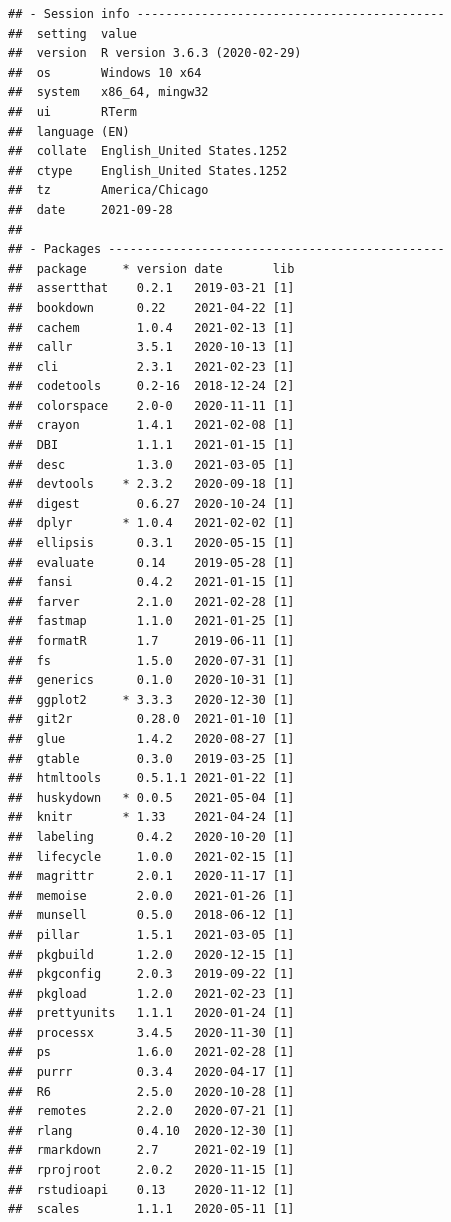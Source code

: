 \documentclass[print]{nuthesis}
\begin{document}
\begin{verbatim}
## - Session info -------------------------------------------
##  setting  value                       
##  version  R version 3.6.3 (2020-02-29)
##  os       Windows 10 x64              
##  system   x86_64, mingw32             
##  ui       RTerm                       
##  language (EN)                        
##  collate  English_United States.1252  
##  ctype    English_United States.1252  
##  tz       America/Chicago             
##  date     2021-09-28                  
## 
## - Packages -----------------------------------------------
##  package     * version date       lib
##  assertthat    0.2.1   2019-03-21 [1]
##  bookdown      0.22    2021-04-22 [1]
##  cachem        1.0.4   2021-02-13 [1]
##  callr         3.5.1   2020-10-13 [1]
##  cli           2.3.1   2021-02-23 [1]
##  codetools     0.2-16  2018-12-24 [2]
##  colorspace    2.0-0   2020-11-11 [1]
##  crayon        1.4.1   2021-02-08 [1]
##  DBI           1.1.1   2021-01-15 [1]
##  desc          1.3.0   2021-03-05 [1]
##  devtools    * 2.3.2   2020-09-18 [1]
##  digest        0.6.27  2020-10-24 [1]
##  dplyr       * 1.0.4   2021-02-02 [1]
##  ellipsis      0.3.1   2020-05-15 [1]
##  evaluate      0.14    2019-05-28 [1]
##  fansi         0.4.2   2021-01-15 [1]
##  farver        2.1.0   2021-02-28 [1]
##  fastmap       1.1.0   2021-01-25 [1]
##  formatR       1.7     2019-06-11 [1]
##  fs            1.5.0   2020-07-31 [1]
##  generics      0.1.0   2020-10-31 [1]
##  ggplot2     * 3.3.3   2020-12-30 [1]
##  git2r         0.28.0  2021-01-10 [1]
##  glue          1.4.2   2020-08-27 [1]
##  gtable        0.3.0   2019-03-25 [1]
##  htmltools     0.5.1.1 2021-01-22 [1]
##  huskydown   * 0.0.5   2021-05-04 [1]
##  knitr       * 1.33    2021-04-24 [1]
##  labeling      0.4.2   2020-10-20 [1]
##  lifecycle     1.0.0   2021-02-15 [1]
##  magrittr      2.0.1   2020-11-17 [1]
##  memoise       2.0.0   2021-01-26 [1]
##  munsell       0.5.0   2018-06-12 [1]
##  pillar        1.5.1   2021-03-05 [1]
##  pkgbuild      1.2.0   2020-12-15 [1]
##  pkgconfig     2.0.3   2019-09-22 [1]
##  pkgload       1.2.0   2021-02-23 [1]
##  prettyunits   1.1.1   2020-01-24 [1]
##  processx      3.4.5   2020-11-30 [1]
##  ps            1.6.0   2021-02-28 [1]
##  purrr         0.3.4   2020-04-17 [1]
##  R6            2.5.0   2020-10-28 [1]
##  remotes       2.2.0   2020-07-21 [1]
##  rlang         0.4.10  2020-12-30 [1]
##  rmarkdown     2.7     2021-02-19 [1]
##  rprojroot     2.0.2   2020-11-15 [1]
##  rstudioapi    0.13    2020-11-12 [1]
##  scales        1.1.1   2020-05-11 [1]

\end{verbatim}
\end{document}
